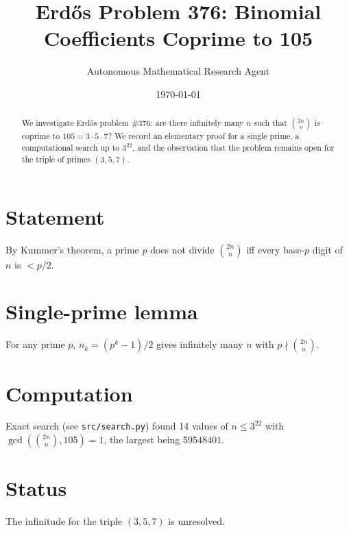 \documentclass{article}
\title{Erd\H{o}s Problem 376: Binomial Coefficients Coprime to 105}
\author{Autonomous Mathematical Research Agent}
\date{\today}
\begin{document}
\maketitle

\begin{abstract}
We investigate Erd\H{o}s problem \#376: are there infinitely many $n$ such that
$\binom{2n}{n}$ is coprime to $105=3\cdot 5\cdot 7$?
We record an elementary proof for a single prime, a computational search up
to $3^{22}$, and the observation that the problem remains open for the triple
of primes $(3,5,7)$.
\end{abstract}

\section{Statement}
By Kummer's theorem, a prime $p$ does not divide $\binom{2n}{n}$ iff every
base-$p$ digit of $n$ is $<p/2$.

\section{Single-prime lemma}
For any prime $p$, $n_k=(p^k-1)/2$ gives infinitely many $n$ with
$p\nmid \binom{2n}{n}$.

\section{Computation}
Exact search (see \texttt{src/search.py}) found 14 values of $n\le 3^{22}$ with
$\gcd(\binom{2n}{n},105)=1$, the largest being $59548401$.

\section{Status}
The infinitude for the triple $(3,5,7)$ is unresolved.
\end{document}
